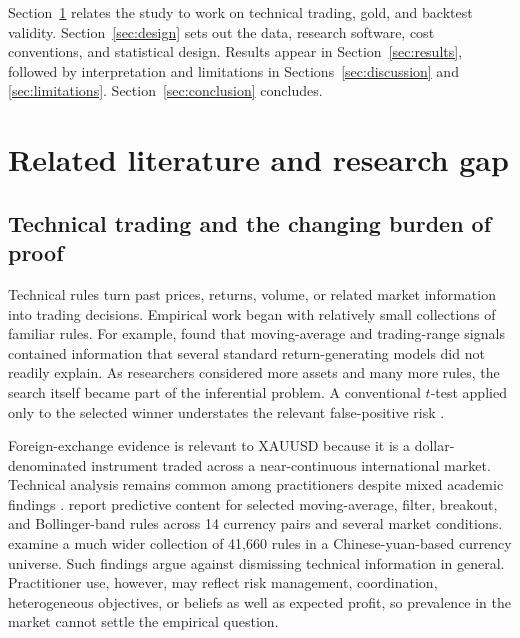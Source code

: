 Section~\ref{sec:literature} relates the study to work on technical trading, gold, and backtest validity. Section~\ref{sec:design} sets out the data, research software, cost conventions, and statistical design. Results appear in Section~\ref{sec:results}, followed by interpretation and limitations in Sections~\ref{sec:discussion} and \ref{sec:limitations}. Section~\ref{sec:conclusion} concludes.

\section{Related literature and research gap}\label{sec:literature}

\subsection{Technical trading and the changing burden of proof}

Technical rules turn past prices, returns, volume, or related market information into trading decisions. Empirical work began with relatively small collections of familiar rules. For example, \citet{brock1992} found that moving-average and trading-range signals contained information that several standard return-generating models did not readily explain. As researchers considered more assets and many more rules, the search itself became part of the inferential problem. A conventional $t$-test applied only to the selected winner understates the relevant false-positive risk \citep{park2007}.

Foreign-exchange evidence is relevant to XAUUSD because it is a dollar-denominated instrument traded across a near-continuous international market. Technical analysis remains common among practitioners despite mixed academic findings \citep{menkhoff2007}. \citet{dockery2023} report predictive content for selected moving-average, filter, breakout, and Bollinger-band rules across 14 currency pairs and several market conditions. \citet{song2025} examine a much wider collection of 41,660 rules in a Chinese-yuan-based currency universe. Such findings argue against dismissing technical information in general. Practitioner use, however, may reflect risk management, coordination, heterogeneous objectives, or beliefs as well as expected profit, so prevalence in the market cannot settle the empirical question.

